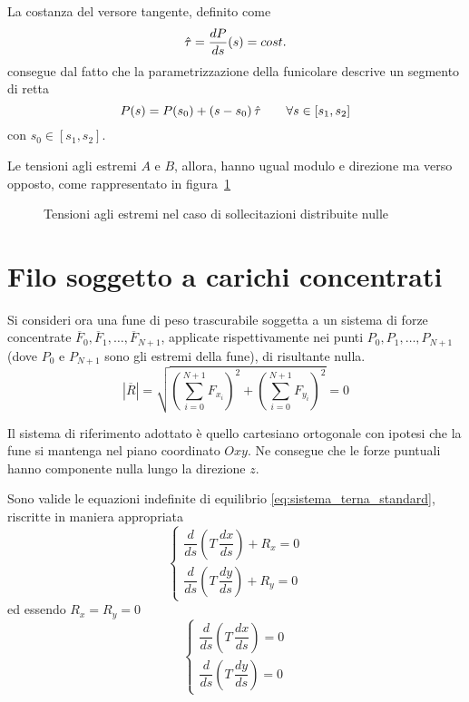 La costanza del versore tangente, definito come
\[
 \hat{\tau} = \dfrac{dP}{ds}(s) = cost.
\]
consegue dal fatto che la parametrizzazione della funicolare descrive un segmento di retta
\[
 P(s) = P(s_0) + (s - s_0 )\,\hat{\tau}\qquad \forall s\in[s_1, s_2]
\]
con $s_0\in[s_1, s_2]$.

Le tensioni agli estremi $A$ e $B$, allora, hanno ugual modulo e direzione ma verso opposto, come rappresentato in figura~\ref{fig:tensioni_forza_nulla}

\begin{figure}
 \centering
 \caption{Tensioni agli estremi nel caso di sollecitazioni distribuite nulle}
 \label{fig:tensioni_forza_nulla}
\end{figure}


\section{Filo soggetto a carichi concentrati}
Si consideri ora una fune di peso trascurabile soggetta a un sistema di forze concentrate $\overline{F}_0, \overline{F}_1, \dots,  \overline{F}_{N+1}$, applicate rispettivamente nei punti $P_0, P_1, \dots, P_{N+1}$ (dove $P_0$ e $P_{N+1}$ sono gli estremi della fune), di risultante nulla. 
\[
\left|\overline{R}\right| = \sqrt{\left(\sum_{i=0}^{N+1}F_{x_i}\right)^2 +\left(\sum_{i=0}^{N+1}F_{y_i}\right)^2} = 0
\]

Il sistema di riferimento adottato è quello cartesiano ortogonale con ipotesi che la fune si mantenga nel piano coordinato $Oxy$. Ne consegue che le forze puntuali hanno componente nulla lungo la direzione $z$.

Sono valide le equazioni indefinite di equilibrio \eqref{eq:sistema_terna_standard}, riscritte in maniera appropriata
\[
\begin{cases} 
  \dfrac{d}{ds}\left(T\,\dfrac{dx}{ds}\right) + R_x = 0\\[1.5ex]
  \dfrac{d}{ds}\left(T\,\dfrac{dy}{ds}\right) + R_y = 0
\end{cases}
\]
ed essendo $R_x = R_y = 0$
\begin{equation}
\label{eq:equazione_indefinita_equilibrio_concentrati}
\begin{cases} 
  \dfrac{d}{ds}\left(T\,\dfrac{dx}{ds}\right) = 0\\[1.5ex]
  \dfrac{d}{ds}\left(T\,\dfrac{dy}{ds}\right) = 0
\end{cases}
\end{equation}

